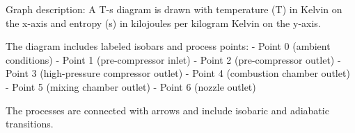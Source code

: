 Graph description:  
A T-s diagram is drawn with temperature (T) in Kelvin on the x-axis and entropy (s) in kilojoules per kilogram Kelvin on the y-axis.  

The diagram includes labeled isobars and process points:  
- Point 0 (ambient conditions)  
- Point 1 (pre-compressor inlet)  
- Point 2 (pre-compressor outlet)  
- Point 3 (high-pressure compressor outlet)  
- Point 4 (combustion chamber outlet)  
- Point 5 (mixing chamber outlet)  
- Point 6 (nozzle outlet)  

The processes are connected with arrows and include isobaric and adiabatic transitions.